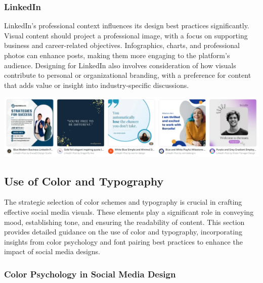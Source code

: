 \documentclass[
]{book}
\begin{document}
\hypertarget{linkedin-1}{%
\subsubsection*{LinkedIn}\label{linkedin-1}}

LinkedIn's professional context influences its design best practices significantly. Visual content should project a professional image, with a focus on supporting business and career-related objectives. Infographics, charts, and professional photos can enhance posts, making them more engaging to the platform's audience. Designing for LinkedIn also involves consideration of how visuals contribute to personal or organizational branding, with a preference for content that adds value or insight into industry-specific discussions.

\href{https://www.canva.com/linkedin-posts/templates/}{\includegraphics[width=1\textwidth,height=\textheight]{images/clipboard-2317314021.png}}

\hypertarget{use-of-color-and-typography}{%
\subsection*{Use of Color and Typography}\label{use-of-color-and-typography}}

The strategic selection of color schemes and typography is crucial in crafting effective social media visuals. These elements play a significant role in conveying mood, establishing tone, and ensuring the readability of content. This section provides detailed guidance on the use of color and typography, incorporating insights from color psychology and font pairing best practices to enhance the impact of social media designs.

\hypertarget{color-psychology-in-social-media-design}{%
\subsubsection*{Color Psychology in Social Media Design}\label{color-psychology-in-social-media-design}}
\end{document}
